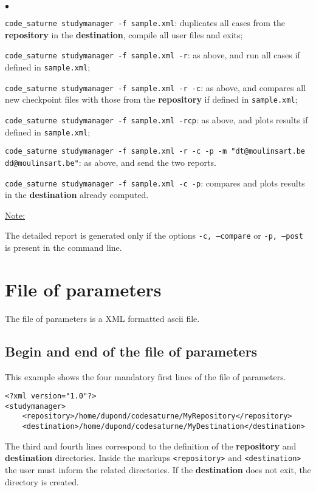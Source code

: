 \documentclass[a4paper,10pt,twoside]{csshortdoc}
\begin{document}
\begin{list}{$\bullet$}{}
\item \texttt{code\_saturne studymanager -f sample.xml}: duplicates all cases from
the \textbf{repository} in the \textbf{destination}, compile all user files
and exits;
\item \texttt{code\_saturne studymanager -f sample.xml -r}: as above, and run all
cases if defined in \texttt{sample.xml};
\item \texttt{code\_saturne studymanager -f sample.xml -r -c}: as above, and compares
all new checkpoint files with those from the \textbf{repository} if defined
in \texttt{sample.xml};
\item \texttt{code\_saturne studymanager -f sample.xml -rcp}: as above, and plots
results if defined in \texttt{sample.xml};
\item \texttt{code\_saturne studymanager -f sample.xml -r -c -p -m
"dt@moulinsart.be dd@moulinsart.be"}: as above, and send the two
reports.
\item \texttt{code\_saturne studymanager -f sample.xml -c -p}: compares and plots
results in the \textbf{destination} already computed.
\end{list}

\underline{Note:}

The detailed report is generated only if the options \texttt{-c, --compare}
or \texttt{-p, --post} is present in the command line.

\section{File of parameters}

The file of parameters is a XML formatted ascii file.

\subsection{Begin and end of the file of parameters}

This example shows the four mandatory first lines of the file of parameters.

\small
\begin{verbatim}
<?xml version="1.0"?>
<studymanager>
    <repository>/home/dupond/codesaturne/MyRepository</repository>
    <destination>/home/dupond/codesaturne/MyDestination</destination>
\end{verbatim}
\normalsize

The third and fourth lines correspond to the definition of the
\textbf{repository} and \textbf{destination} directories.
Inside the markups \texttt{<repository>} and \texttt{<destination>} the user
must inform the related directories. If the \textbf{destination} does not exit,
the directory is created.
\end{document}
